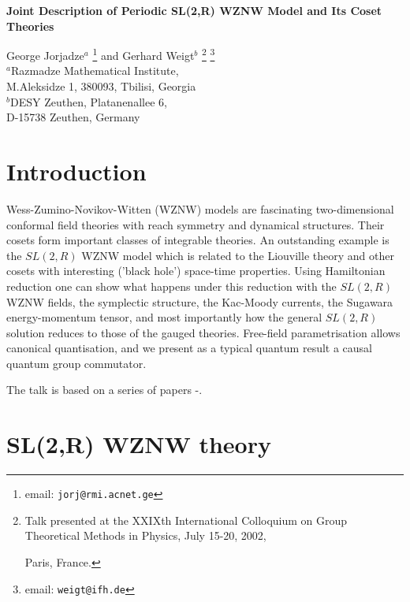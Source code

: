 \documentclass[a4paper,12]{article}
\renewcommand{\title}[1]{\begin{center}\bf\Large #1\end{center}}
\renewcommand{\author}[1]{\begin{center}\large #1\end{center}}
\begin{document}
\title{Joint Description of Periodic SL(2,R) WZNW Model and Its
  Coset Theories}

\author{
 George Jorjadze${}^a$ 
\footnote{email: \tt jorj@rmi.acnet.ge}
 and Gerhard Weigt${}^b$  
\footnote{Talk presented at the XXIXth International 
Colloquium on Group Theoretical Methods in Physics, July 15-20, 2002, 

\hspace{1.8mm}
Paris, France.}
\footnote{email: \tt weigt@ifh.de} \\
{\small${}^a$Razmadze Mathematical Institute,}\\
  {\small M.Aleksidze 1, 380093, Tbilisi, Georgia}\\
{\small${}^b$DESY Zeuthen, Platanenallee 6,}\\
{\small D-15738 Zeuthen, Germany}}

\begin{abstract}

\noindent
Liouville, $SL(2,R)/U(1)$ and $SL(2,R)/R_+$
coset structures are completely described by gauge invariant
Hamiltonian reduction of the  $SL(2,R)$ WZNW theory.
\end{abstract}

\section{Introduction}

Wess-Zumino-Novikov-Witten (WZNW) models are fascinating
two-dimensional conformal field theories with reach symmetry and
dynamical structures. Their cosets form important classes of
integrable theories. An outstanding example is the $SL(2,R)$ WZNW
model which is related to the Liouville theory and other cosets
with interesting ('black hole') space-time properties. Using
Hamiltonian reduction one can show what happens under this reduction
with the $SL(2,R)$ WZNW fields, the symplectic structure, the
Kac-Moody currents, the Sugawara energy-momentum tensor, and most
importantly how the general $SL(2,R)$ solution reduces to those of the
gauged theories. Free-field parametrisation allows canonical
quantisation, and we present as a typical quantum result a causal
quantum group commutator.

The talk is based on a series of papers \cite{OW}-\cite{FJW2}.


\section{SL(2,R) WZNW theory}
\end{document}
